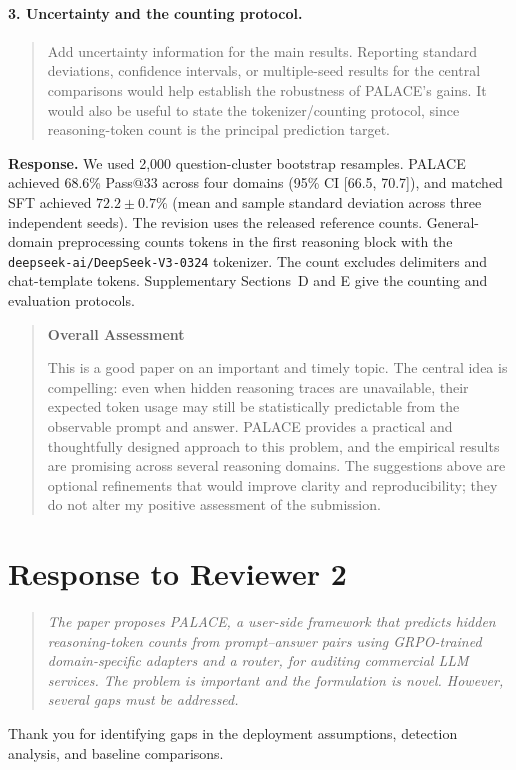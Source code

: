 \documentclass[11pt]{article}
\begin{document}
\paragraph{3. Uncertainty and the counting protocol.}
\begin{quote}\small
Add uncertainty information for the main results. Reporting standard deviations, confidence intervals, or multiple-seed results for the central comparisons would help establish the robustness of PALACE's gains. It would also be useful to state the tokenizer/counting protocol, since reasoning-token count is the principal prediction target.
\end{quote}
\textbf{Response.} We used 2,000 question-cluster bootstrap resamples. PALACE achieved 68.6\% Pass@33 across four domains (95\% CI [66.5, 70.7]), and matched SFT achieved \(72.2\pm0.7\%\) (mean and sample standard deviation across three independent seeds). The revision uses the released reference counts. General-domain preprocessing counts tokens in the first reasoning block with the \nolinkurl{deepseek-ai/DeepSeek-V3-0324} tokenizer. The count excludes delimiters and chat-template tokens. Supplementary Sections~D and E give the counting and evaluation protocols.

\begin{quote}\small
\textbf{Overall Assessment}

This is a good paper on an important and timely topic. The central idea is compelling: even when hidden reasoning traces are unavailable, their expected token usage may still be statistically predictable from the observable prompt and answer. PALACE provides a practical and thoughtfully designed approach to this problem, and the empirical results are promising across several reasoning domains. The suggestions above are optional refinements that would improve clarity and reproducibility; they do not alter my positive assessment of the submission.
\end{quote}

\section*{Response to Reviewer 2}
\begin{quote}\small\itshape
The paper proposes PALACE, a user-side framework that predicts hidden reasoning-token counts from prompt–answer pairs using GRPO-trained domain-specific adapters and a router, for auditing commercial LLM services. The problem is important and the formulation is novel. However, several gaps must be addressed.
\end{quote}
Thank you for identifying gaps in the deployment assumptions, detection analysis, and baseline comparisons.
\end{document}

